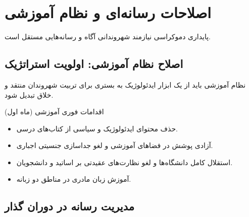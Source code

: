 \chapter{اصلاحات رسانه‌ای و نظام آموزشی}
\label{app:media_edu}

پایداری دموکراسی نیازمند شهروندانی آگاه و رسانه‌هایی مستقل است.

\section{اصلاح نظام آموزشی: اولویت استراتژیک}

نظام آموزشی باید از یک ابزار ایدئولوژیک به بستری برای تربیت شهروندان منتقد و خلاق تبدیل شود.

\begin{modernbox}{اقدامات فوری آموزشی (ماه اول)}
\begin{itemize}
    \item حذف محتوای ایدئولوژیک و سیاسی از کتاب‌های درسی.
    \item آزادی پوشش در فضاهای آموزشی و لغو جداسازی جنسیتی اجباری.
    \item استقلال کامل دانشگاه‌ها و لغو نظارت‌های عقیدتی بر اساتید و دانشجویان.
    \item آموزش زبان مادری در مناطق دو زبانه.
\end{itemize}
\end{modernbox}

\section{مدیریت رسانه در دوران گذار}

\begin{center}
\end{center}

